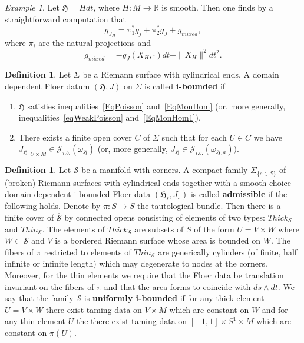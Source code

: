 \documentclass[11pt]{amsart}
\newcommand{\R}{\mathbb{R}}
\theoremstyle{definition}
\newtheorem{df}[tm]{Definition}
\theoremstyle{remark}
\newtheorem{ex}[tm]{Example}
\begin{document}
\begin{ex}\label{ExTransInv}
Let $\mathfrak{H}=Hdt$, where $H:M\to\R$ is smooth. Then one finds by a straightforward computation that
\[
g_{J_H}=\pi_1^*g_j + \pi_2^*g_J+g_{mixed},
\]
where $\pi_i$ are the natural projections and
\[
g_{mixed}=-g_J(X_H,\cdot)dt+\|X_H\|^2dt^2.
\]
\end{ex}


\begin{df}\label{dfFloDataWbounded}
Let $\Sigma$ be a Riemann surface with cylindrical ends. A domain dependent Floer datum $(\mathfrak{H},J)$ on $\Sigma$ is called \textbf{i-bounded} if
\begin{enumerate}
\item $\mathfrak{H}$ satisfies inequalities~\eqref{EqPoisson} and~\eqref{EqMonHom} (or, more generally, inequalities~\eqref{eqWeakPoisson} and~\eqref{EqMonHom1}).
\item There exists a finite open cover $C$ of $\Sigma$ such that for each $U\in C$ we have $J_{\mathfrak{H}}|_{\overline{U}\times M}\in\mathcal{J}_{i.b.}(\omega_\mathfrak{H})$ (or, more generally, $J_{\mathfrak{H}}\in\mathcal{J}_{i.b.}(\omega_{\mathfrak{H},a})).$
 \end{enumerate}
\end{df}

 \begin{df}\label{dfFloDataWboundedFamily}
 Let $\mathcal{S}$ be a manifold with corners. A compact family $\Sigma_{\{s\in\mathcal{S}\}}$ of (broken) Riemann surfaces with cylindrical ends together with a smooth choice  domain dependent i-bounded Floer data $(\mathfrak{H}_s,J_s)$  is called \textbf{admissible} if the following holds. Denote by $\pi:\overline{S}\to S$ the tautological bundle. Then there is a finite cover of $\overline{\mathcal{S}}$ by connected opens consisting of elements of two types: $Thick_{\mathcal{S}}$ and $Thin_{\mathcal{S}}$.  The elements of $Thick_{\mathcal{S}}$ are subsets of $\overline{S}$ of the form $U=V\times W$ where $W\subset\mathcal{S}$  and $V$ is a bordered Riemann surface whose area is bounded on $W$. The fibers of $\pi$ restricted to elements of $Thin_{\mathcal{S}}$ are generically cylinders (of finite, half infinite or infinite length) which may degenerate to nodes at the corners.  Moreover, for the thin elements we require that the Floer data be translation invariant on the  fibers of $\pi$ and that the area forms to coincide with $ds\wedge dt$. We say that the family $\mathcal{S}$  is \textbf{uniformly i-bounded } if for any thick element $U=V\times W$ there exist taming  data on $V\times M $ which are constant on $W$ and for any thin element $U$ the there exist taming data on $[-1,1]\times S^1\times M$ which are constant on $\pi(U)$.

\end{df}
\end{document}
